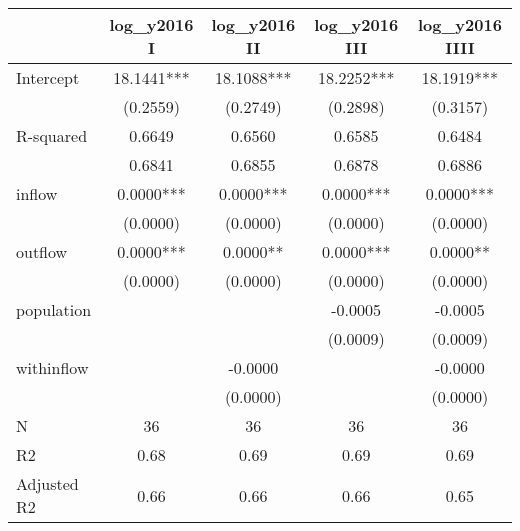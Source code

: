 \begin{table}
\caption{}
\begin{center}
\begin{tabular}{lcccc}
\hline
            & log\_y2016 I & log\_y2016 II & log\_y2016 III & log\_y2016 IIII  \\
\midrule
Intercept   & 18.1441***   & 18.1088***    & 18.2252***     & 18.1919***       \\
            & (0.2559)     & (0.2749)      & (0.2898)       & (0.3157)         \\
R-squared   & 0.6649       & 0.6560        & 0.6585         & 0.6484           \\
            & 0.6841       & 0.6855        & 0.6878         & 0.6886           \\
inflow      & 0.0000***    & 0.0000***     & 0.0000***      & 0.0000***        \\
            & (0.0000)     & (0.0000)      & (0.0000)       & (0.0000)         \\
outflow     & 0.0000***    & 0.0000**      & 0.0000***      & 0.0000**         \\
            & (0.0000)     & (0.0000)      & (0.0000)       & (0.0000)         \\
population  &              &               & -0.0005        & -0.0005          \\
            &              &               & (0.0009)       & (0.0009)         \\
withinflow  &              & -0.0000       &                & -0.0000          \\
            &              & (0.0000)      &                & (0.0000)         \\
N           & 36           & 36            & 36             & 36               \\
R2          & 0.68         & 0.69          & 0.69           & 0.69             \\
Adjusted R2 & 0.66         & 0.66          & 0.66           & 0.65             \\
\hline
\end{tabular}
\end{center}
\end{table}